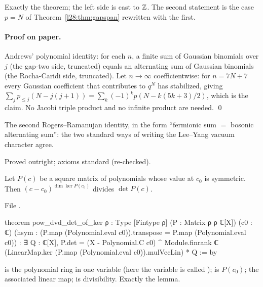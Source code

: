 \begin{dictionary}
Exactly the theorem; the left side is cast to ${\mathbb{Z}}$. The second statement is the case $p=N$ of Theorem~\ref{l28:thm:gapspan} rewritten with the first.
\end{dictionary}

\paragraph{Proof on paper.} Andrews' polynomial identity: for each $n$, a finite sum of Gaussian binomials over $j$ (the gap-two side, truncated) equals an
alternating sum of Gaussian binomials (the Rocha-Caridi side, truncated). Let $n\to\infty$ coefficientwise: for $n=7N+7$ every Gaussian coefficient that contributes to
$q^N$ has stabilized, giving $\sum_jp_{\le j}(N-j(j+1))=\sum_k(-1)^kp(N-k(5k+3)/2)$, which is the claim. No Jacobi triple product and no infinite product are needed. \qed

\begin{physics}
The second Rogers--Ramanujan identity, in the form ``fermionic sum $=$ bosonic alternating sum'': the two standard ways of writing the Lee--Yang vacuum
character agree.
\end{physics}

\begin{status}
Proved outright; axioms standard (re-checked).
\end{status}

\begin{lemma}\label{l28:lem:corank}
Let $P(c)$ be a square matrix of polynomials whose value at $c_0$ is symmetric. Then $(c-c_0)^{\dim\ker P(c_0)}$ divides $\det P(c)$.
\end{lemma}

\noindent File .
\begin{leancode}
theorem pow_dvd_det_of_ker {ρ : Type} [Fintype ρ] (P : Matrix ρ ρ ℂ[X]) (c0 : ℂ)
    (hsym : (P.map (Polynomial.eval c0)).transpose = P.map (Polynomial.eval c0)) :
    ∃ Q : ℂ[X], P.det =
      (X - Polynomial.C c0) ^ Module.finrank ℂ (LinearMap.ker (P.map (Polynomial.eval c0)).mulVecLin) * Q := by
\end{leancode}

\begin{dictionary}
 is the polynomial ring in one variable (here the variable is called );  is $P(c_0)$;  the
associated linear map;  is divisibility. Exactly the lemma.
\end{dictionary}

